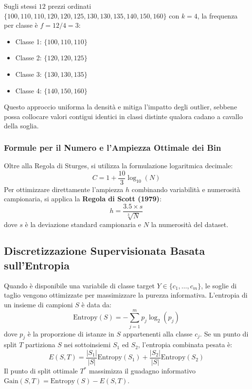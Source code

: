 Sugli stessi $12$ prezzi ordinati $\{100, 110, 110, 120, 120, 125, 130, 130, 135, 140, 150, 160\}$ con $k=4$, la frequenza per classe è $f = 12/4 = 3$:
\begin{itemize}[noitemsep]
    \item Classe 1: $\{100, 110, 110\}$
    \item Classe 2: $\{120, 120, 125\}$
    \item Classe 3: $\{130, 130, 135\}$
    \item Classe 4: $\{140, 150, 160\}$
\end{itemize}
Questo approccio uniforma la densità e mitiga l'impatto degli outlier, sebbene possa collocare valori contigui identici in classi distinte qualora cadano a cavallo della soglia.

\subsubsection{Formule per il Numero e l'Ampiezza Ottimale dei Bin}
Oltre alla Regola di Sturges, si utilizza la formulazione logaritmica decimale:
\begin{equation}
    C = 1 + \frac{10}{3} \log_{10}(N)
\end{equation}
Per ottimizzare direttamente l'ampiezza $h$ combinando variabilità e numerosità campionaria, si applica la \textbf{Regola di Scott (1979)}:
\begin{equation}
    h = \frac{3.5 \times s}{\sqrt[3]{N}}
\end{equation}
dove $s$ è la deviazione standard campionaria e $N$ la numerosità del dataset.

\subsection{Discretizzazione Supervisionata Basata sull'Entropia}

Quando è disponibile una variabile di classe target $Y \in \{c_1, \dots, c_m\}$, le soglie di taglio vengono ottimizzate per massimizzare la purezza informativa.
L'entropia di un insieme di campioni $S$ è data da:
\begin{equation}
    \text{Entropy}(S) = - \sum_{j=1}^m p_j \log_2(p_j)
\end{equation}
dove $p_j$ è la proporzione di istanze in $S$ appartenenti alla classe $c_j$. Se un punto di split $T$ partiziona $S$ nei sottoinsiemi $S_1$ ed $S_2$, l'entropia combinata pesata è:
\begin{equation}
    E(S, T) = \frac{|S_1|}{|S|} \text{Entropy}(S_1) + \frac{|S_2|}{|S|} \text{Entropy}(S_2)
\end{equation}
Il punto di split ottimale $T^*$ massimizza il guadagno informativo $\text{Gain}(S, T) = \text{Entropy}(S) - E(S, T)$.

